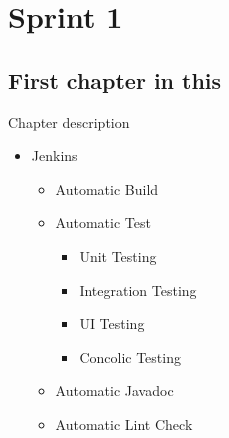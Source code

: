 \part{Sprint 1}

\chapter{First chapter in this}%
Chapter description


\begin{itemize}
  \item Jenkins
  \begin{itemize}
    \item Automatic Build
    \item Automatic Test
    \begin{itemize}
      \item Unit Testing
      \item Integration Testing
      \item UI Testing
      \item Concolic Testing
    \end{itemize}
    \item Automatic Javadoc
    \item Automatic Lint Check
  \end{itemize}
\end{itemize}

%
